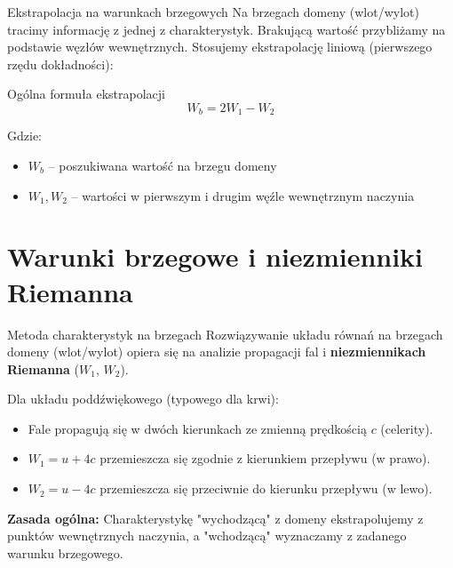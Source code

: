 \documentclass[aspectratio=169]{beamer}
\begin{document}
\begin{frame}{Ekstrapolacja na warunkach brzegowych}
Na brzegach domeny (wlot/wylot) tracimy informację z jednej z charakterystyk. Brakującą wartość przybliżamy na podstawie węzłów wewnętrznych.
Stosujemy ekstrapolację liniową (pierwszego rzędu dokładności):
\begin{block}{Ogólna formuła ekstrapolacji}
$$ W_{b} = 2W_{1} - W_{2} $$
\end{block}
Gdzie:
\begin{itemize}
\item $W_{b}$ -- poszukiwana wartość na brzegu domeny
\item $W_{1}, W_{2}$ -- wartości w pierwszym i drugim węźle wewnętrznym naczynia
\end{itemize}
\end{frame}


\section{Warunki brzegowe i niezmienniki Riemanna}

\begin{frame}{Metoda charakterystyk na brzegach}
    Rozwiązywanie układu równań na brzegach domeny (wlot/wylot) opiera się na analizie propagacji fal i \textbf{niezmiennikach Riemanna} ($W_1$, $W_2$).
    
    \vspace{0.3cm}
    Dla układu poddźwiękowego (typowego dla krwi):
    \begin{itemize}
        \item Fale propagują się w dwóch kierunkach ze zmienną prędkością $c$ (celerity).
        \item $W_1 = u + 4c$ przemieszcza się zgodnie z kierunkiem przepływu (w prawo).
        \item $W_2 = u - 4c$ przemieszcza się przeciwnie do kierunku przepływu (w lewo).
    \end{itemize}
    \vspace{0.3cm}
    \textbf{Zasada ogólna:} Charakterystykę "wychodzącą" z domeny ekstrapolujemy z punktów wewnętrznych naczynia, a "wchodzącą" wyznaczamy z zadanego warunku brzegowego.
\end{frame}
\end{document}

